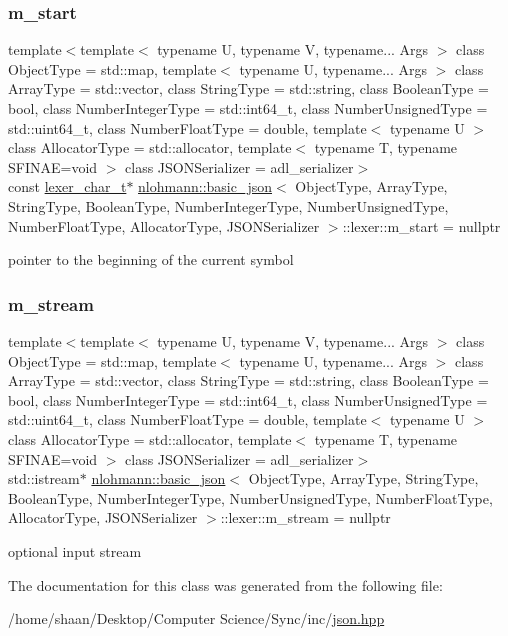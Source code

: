 \subsubsection{\texorpdfstring{m\+\_\+start}{m\_start}}
{\footnotesize\ttfamily template$<$template$<$ typename U, typename V, typename... Args $>$ class Object\+Type = std\+::map, template$<$ typename U, typename... Args $>$ class Array\+Type = std\+::vector, class String\+Type  = std\+::string, class Boolean\+Type  = bool, class Number\+Integer\+Type  = std\+::int64\+\_\+t, class Number\+Unsigned\+Type  = std\+::uint64\+\_\+t, class Number\+Float\+Type  = double, template$<$ typename U $>$ class Allocator\+Type = std\+::allocator, template$<$ typename T, typename S\+F\+I\+N\+A\+E=void $>$ class J\+S\+O\+N\+Serializer = adl\+\_\+serializer$>$ \\
const \hyperlink{classnlohmann_1_1basic__json_1_1lexer_abe04be04d0575249f8806c334bacbc80}{lexer\+\_\+char\+\_\+t}$\ast$ \hyperlink{classnlohmann_1_1basic__json}{nlohmann\+::basic\+\_\+json}$<$ Object\+Type, Array\+Type, String\+Type, Boolean\+Type, Number\+Integer\+Type, Number\+Unsigned\+Type, Number\+Float\+Type, Allocator\+Type, J\+S\+O\+N\+Serializer $>$\+::lexer\+::m\+\_\+start = nullptr\hspace{0.3cm}{\ttfamily [private]}}



pointer to the beginning of the current symbol 

\mbox{\label{classnlohmann_1_1basic__json_1_1lexer_af71aa97e4a1f04c2b891856228f57cc4}} 
\subsubsection{\texorpdfstring{m\+\_\+stream}{m\_stream}}
{\footnotesize\ttfamily template$<$template$<$ typename U, typename V, typename... Args $>$ class Object\+Type = std\+::map, template$<$ typename U, typename... Args $>$ class Array\+Type = std\+::vector, class String\+Type  = std\+::string, class Boolean\+Type  = bool, class Number\+Integer\+Type  = std\+::int64\+\_\+t, class Number\+Unsigned\+Type  = std\+::uint64\+\_\+t, class Number\+Float\+Type  = double, template$<$ typename U $>$ class Allocator\+Type = std\+::allocator, template$<$ typename T, typename S\+F\+I\+N\+A\+E=void $>$ class J\+S\+O\+N\+Serializer = adl\+\_\+serializer$>$ \\
std\+::istream$\ast$ \hyperlink{classnlohmann_1_1basic__json}{nlohmann\+::basic\+\_\+json}$<$ Object\+Type, Array\+Type, String\+Type, Boolean\+Type, Number\+Integer\+Type, Number\+Unsigned\+Type, Number\+Float\+Type, Allocator\+Type, J\+S\+O\+N\+Serializer $>$\+::lexer\+::m\+\_\+stream = nullptr\hspace{0.3cm}{\ttfamily [private]}}



optional input stream 



The documentation for this class was generated from the following file\+:\begin{DoxyCompactItemize}
\item 
/home/shaan/\+Desktop/\+Computer Science/\+Sync/inc/\hyperlink{json_8hpp}{json.\+hpp}\end{DoxyCompactItemize}
